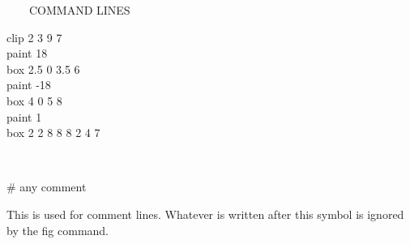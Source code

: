 \begin{qsection}{\ ~~~COMMAND LINES}
\begin{minipage}[t]{9cm}
\begin{minipage}[b]{4.5cm}
\vspace*{3mm}
clip 2 3 9 7\\
paint 18\\
box 2.5 0 3.5 6\\
paint -18 \\
box 4 0 5 8\\
paint 1\\
box  2 2 8 8 8 2 4 7
\end{minipage}
\end{minipage}\\

\begin{minipage}[t]{5.5cm}
\# any comment
\end{minipage}
\begin{minipage}[t]{9cm}
This is used for comment lines.
Whatever is written after this symbol
is ignored by the fig command.
\end{minipage}\\
\end{qsection}

